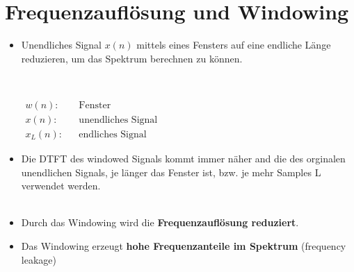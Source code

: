 \section{Frequenzauflösung und Windowing}
	\begin{itemize}
	 \item Unendliches Signal $x(n)$ mittels eines Fensters auf eine endliche Länge reduzieren, um das Spektrum berechnen zu können.\\
		\begin{minipage}{0.5\textwidth}
			$\qquad$
		\end{minipage}
		\begin{minipage}{0.3\textwidth}
			$\begin{array}{lcl}
			w(n): && \text{Fenster}\\
			x(n):&& \text{unendliches Signal}\\
			x_L(n):&& \text{endliches Signal}
			\end{array}$
		\end{minipage}
	 \item Die DTFT des windowed Signals kommt immer näher and die des orginalen unendlichen Signals, je länger das Fenster ist, bzw. je mehr Samples L verwendet werden.\\[0.2cm]
		\\
	 \item Durch das Windowing wird die \textbf{Frequenzauflösung reduziert}.\\[-0.5cm]
	 \item Das Windowing erzeugt \textbf{hohe Frequenzanteile im Spektrum} (frequency leakage)
	\end{itemize}
	
